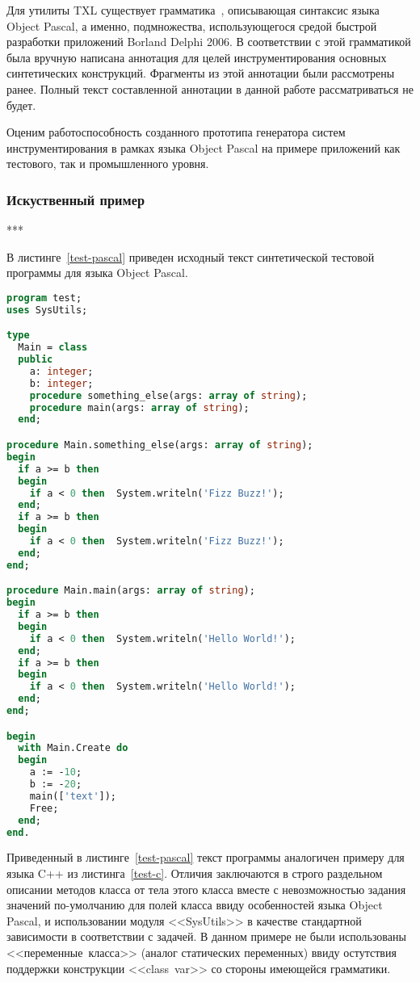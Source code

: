 Для утилиты TXL существует грамматика~\cite{txl-resources}, описывающая синтаксис языка Object Pascal, а именно, подмножества, использующегося средой быстрой разработки приложений Borland Delphi 2006.
В соответствии с этой грамматикой была вручную написана аннотация для целей инструментирования основных синтетических конструкций.
Фрагменты из этой аннотации были рассмотрены ранее.
Полный текст составленной аннотации в данной работе рассматриваться не будет.

Оценим работоспособность созданного прототипа генератора систем инструментирования в рамках языка Object Pascal на примере приложений как тестового, так и промышленного уровня.

\subsubsection{Искуственный пример}

***

В листинге~\ref{test-pascal} приведен исходный текст синтетической тестовой программы для языка Object Pascal.

\begin{lstlisting}[frame=single, language=Pascal, label={test-pascal}, caption={Исходный текст тестового приложения.}]
program test;
uses SysUtils;

type
  Main = class
  public
    a: integer;
    b: integer;
    procedure something_else(args: array of string);
    procedure main(args: array of string);
  end;

procedure Main.something_else(args: array of string);
begin
  if a >= b then
  begin
    if a < 0 then  System.writeln('Fizz Buzz!');
  end;
  if a >= b then
  begin
    if a < 0 then  System.writeln('Fizz Buzz!');
  end;
end;

procedure Main.main(args: array of string);
begin
  if a >= b then
  begin
    if a < 0 then  System.writeln('Hello World!');
  end;
  if a >= b then
  begin
    if a < 0 then  System.writeln('Hello World!');
  end;
end;

begin
  with Main.Create do
  begin
    a := -10;
    b := -20;
    main(['text']);
    Free;
  end;
end.
\end{lstlisting}

Приведенный в листинге~\ref{test-pascal} текст программы аналогичен примеру для языка C++ из листинга~\ref{test-c}.
Отличия заключаются в строго раздельном описании методов класса от тела этого класса вместе с невозможностью задания значений по-умолчанию для полей класса ввиду особенностей языка Object Pascal, и использовании модуля <<SysUtils>> в качестве стандартной зависимости в соответствии с задачей.
В данном примере не были использованы <<переменные~класса>> (аналог статических переменных) ввиду остутствия поддержки конструкции <<class~var>> со стороны имеющейся грамматики.


